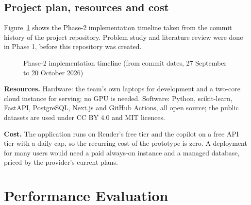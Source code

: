 \documentclass[12pt,a4paper]{report}
\begin{document}
\section{Project plan, resources and cost}
Figure~\ref{fig:gantt} shows the Phase-2 implementation timeline taken from the commit history of the project repository. Problem study and literature review were done in Phase 1, before this repository was created.

\begin{figure}[H]
\centering
{}
\caption{Phase-2 implementation timeline (from commit dates, 27 September to 20 October 2026)}
\label{fig:gantt}
\end{figure}

\textbf{Resources.} Hardware: the team's own laptops for development and a two-core cloud instance for serving; no GPU is needed. Software: Python, scikit-learn, FastAPI, PostgreSQL, Next.js and GitHub Actions, all open source; the public datasets are used under CC BY 4.0 and MIT licences.

\textbf{Cost.} The application runs on Render's free tier and the copilot on a free API tier with a daily cap, so the recurring cost of the prototype is zero. A deployment for many users would need a paid always-on instance and a managed database, priced by the provider's current plans.

\chapter{Performance Evaluation}
\label{ch:perf}
\end{document}
